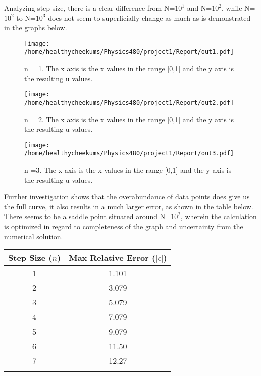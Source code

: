 \documentclass[10pt,showpacs,preprintnumbers,footinbib,amsmath,amssymb,aps,prl,twocolumn,groupedaddress,superscriptaddress,showkeys]{revtex4-1}
\begin{document}
 Analyzing step size, there is a clear difference from N=$10^{1}$ and N=$10^{2}$, while N=$10^{2}$ to N=$10^{3}$ does not seem to superficially change as much as is demonstrated in the graphs below.
 
\begin{figure}[!ht]
	\centering
	\texttt{[image: /home/healthycheekums/Physics480/project1/Report/out1.pdf]}
	\label{uvx}
	\caption{ n = 1. The x axis is the x values in the range [0,1] and the y axis is the resulting u values.}
\end{figure}

\begin{figure}[!ht]
	\centering
	\texttt{[image: /home/healthycheekums/Physics480/project1/Report/out2.pdf]}

	\label{uvx}
	\caption{n = 2. The x axis is the x values in the range [0,1] and the y axis is the resulting u values.}
\end{figure}

\begin{figure}[!ht]
	\centering
	\texttt{[image: /home/healthycheekums/Physics480/project1/Report/out3.pdf]}

	\label{uvx}
	\caption{n =3.  The x axis is the x values in the range [0,1] and the y axis is the resulting u values.}
\end{figure}

Further investigation shows that the overabundance of data points does give us the full curve, it also results in a much larger error, as shown in the table below. There seems to be a saddle point situated around N=$10^{2}$, wherein the calculation is optimized in regard to completeness of the graph and uncertainty from the numerical solution.

\begin{center}
	\begin{tabular}{cc}
		\hline \hline
			Step Size ($n$) &  Max Relative Error ($|\epsilon|$)\\
			\hline
			1 & 1.101\\
			2 & 3.079\\
			3 & 5.079\\
			4 & 7.079\\
			5 & 9.079\\
			6 & 11.50\\
			7 & 12.27\\
			\hline
			\label{errortable}
	\end{tabular}
\end{center}
	
\end{document}
